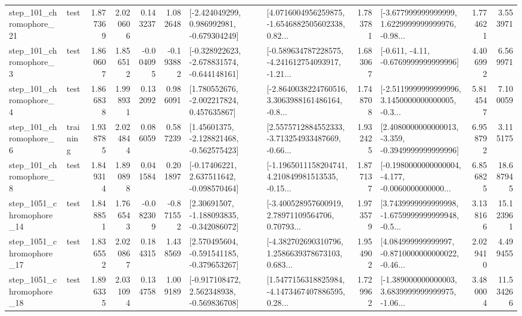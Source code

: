 \begin{tabular}{llrrrrllrlrr}
  step\_101\_chromophore\_21 &      test &      1.877369 &    2.020606 &      0.143237 &  1.082648 &   [-2.424049299, 0.986992981, -0.679304249] &  [4.0716004956259875, -1.6546882505602338, 0.82... &       1.783781 &  [-3.677999999999999, 1.6229999999999976, -0.98... &            1.774621 &          3.553971 \\
   step\_101\_chromophore\_3 &      test &      1.860607 &    1.856512 &     -0.004095 & -0.193882 &  [-0.328922623, -2.678831574, -0.644148161] &  [-0.589634787228575, -4.241612754093917, -1.21... &       1.683067 &               [-0.611, -4.11, -0.6769999999999996] &            4.406992 &          6.569971 \\
   step\_101\_chromophore\_4 &      test &      1.866838 &    1.998931 &      0.132092 &  0.986091 &    [1.780552676, -2.002217824, 0.457635867] &  [-2.8640038224760516, 3.3063988161486164, -0.8... &       1.748708 &  [-2.5119999999999996, 3.1450000000000005, -0.3... &            5.814547 &          7.100059 \\
   step\_101\_chromophore\_6 &  training &      1.938785 &    2.024844 &      0.086059 &  0.587239 &    [1.45601375, -2.128821468, -0.562575423] &  [2.5575712884552333, -3.713254933487669, -0.66... &       1.932425 &  [2.4080000000000013, -3.359, -0.3949999999999996] &            6.958792 &          3.115175 \\
   step\_101\_chromophore\_8 &      test &      1.849314 &    1.890898 &      0.041584 &  0.201897 &    [-0.17406221, 2.637511642, -0.098570464] &  [-1.1965011158204741, 4.210849981513535, -0.15... &       1.877137 &  [-0.1980000000000004, -4.177, -0.0060000000000... &            6.856825 &         18.687945 \\
 step\_1051\_chromophore\_14 &      test &      1.848851 &    1.766543 &     -0.082309 & -0.871552 &    [2.30691507, -1.188093835, -0.342086072] &  [-3.400528957600919, 2.78971109564706, 0.70793... &       1.973579 &  [3.7439999999999998, -1.6759999999999948, -0.5... &            3.138166 &         15.123961 \\
 step\_1051\_chromophore\_17 &      test &      1.836552 &    2.020867 &      0.184315 &  1.438569 &   [2.570495604, -0.591541185, -0.379653267] &  [-4.382702690310796, 1.2586639378673103, 0.683... &       1.954902 &  [4.084999999999997, -0.8710000000000022, -0.46... &            2.029410 &          4.499455 \\
 step\_1051\_chromophore\_18 &      test &      1.896335 &    2.031094 &      0.134758 &  1.009189 &   [-0.917108472, 2.562348938, -0.569836708] &  [1.5477156318825984, -4.1473467407886595, 0.28... &       1.729962 &  [-1.389000000000003, 3.6839999999999975, -1.06... &            3.480004 &         11.534266 \\

\end{tabular}

